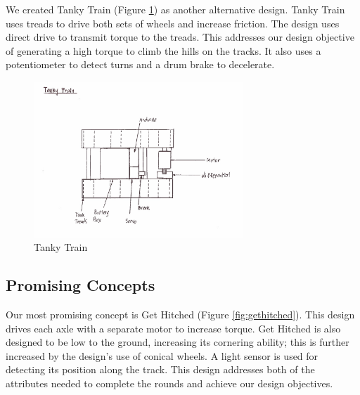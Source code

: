 \documentclass[class=../report, crop=false]{standalone}
\begin{document}
\clearpage

We created Tanky Train (Figure \ref{fig:tankytrain}) as another alternative design.
Tanky Train uses treads to drive both sets of wheels and increase friction.
The design uses direct drive to transmit torque to the treads.
This addresses our design objective of generating a high torque to climb the hills on the tracks.
It also uses a potentiometer to detect turns and a drum brake to decelerate. 

\begin{figure}[H]
	\centering
	\includegraphics[width=0.7\textwidth]{../res/img/tankytrain}
	\caption{Tanky Train}
	\label{fig:tankytrain}
\end{figure}

\clearpage

\subsection{Promising Concepts}

Our most promising concept is Get Hitched (Figure \ref{fig:gethitched}).
This design drives each axle with a separate motor to increase torque.
Get Hitched is also designed to be low to the ground, increasing its cornering ability; this is further increased by the design’s use of conical wheels.
A light sensor is used for detecting its position along the track.
This design addresses both of the attributes needed to complete the rounds and achieve our design objectives.
\end{document}
